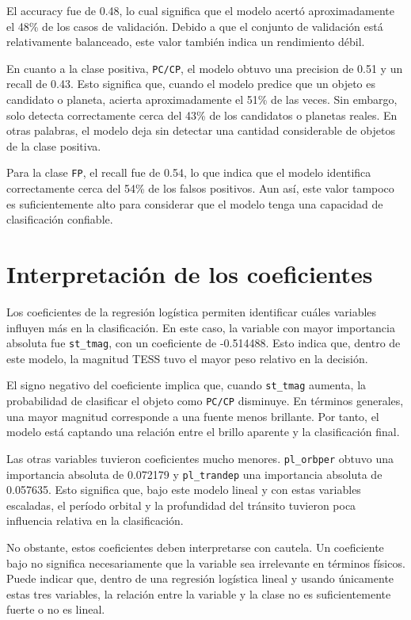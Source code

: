 \documentclass[12pt,letterpaper]{article}
\begin{document}
El accuracy fue de 0.48, lo cual significa que el modelo acertó aproximadamente el 48\% de los casos de validación. Debido a que el conjunto de validación está relativamente balanceado, este valor también indica un rendimiento débil.

En cuanto a la clase positiva, \texttt{PC/CP}, el modelo obtuvo una precision de 0.51 y un recall de 0.43. Esto significa que, cuando el modelo predice que un objeto es candidato o planeta, acierta aproximadamente el 51\% de las veces. Sin embargo, solo detecta correctamente cerca del 43\% de los candidatos o planetas reales. En otras palabras, el modelo deja sin detectar una cantidad considerable de objetos de la clase positiva.

Para la clase \texttt{FP}, el recall fue de 0.54, lo que indica que el modelo identifica correctamente cerca del 54\% de los falsos positivos. Aun así, este valor tampoco es suficientemente alto para considerar que el modelo tenga una capacidad de clasificación confiable.

\section{Interpretación de los coeficientes}

Los coeficientes de la regresión logística permiten identificar cuáles variables influyen más en la clasificación. En este caso, la variable con mayor importancia absoluta fue \texttt{st\_tmag}, con un coeficiente de -0.514488. Esto indica que, dentro de este modelo, la magnitud TESS tuvo el mayor peso relativo en la decisión.

El signo negativo del coeficiente implica que, cuando \texttt{st\_tmag} aumenta, la probabilidad de clasificar el objeto como \texttt{PC/CP} disminuye. En términos generales, una mayor magnitud corresponde a una fuente menos brillante. Por tanto, el modelo está captando una relación entre el brillo aparente y la clasificación final.

Las otras variables tuvieron coeficientes mucho menores. \texttt{pl\_orbper} obtuvo una importancia absoluta de 0.072179 y \texttt{pl\_trandep} una importancia absoluta de 0.057635. Esto significa que, bajo este modelo lineal y con estas variables escaladas, el período orbital y la profundidad del tránsito tuvieron poca influencia relativa en la clasificación.

No obstante, estos coeficientes deben interpretarse con cautela. Un coeficiente bajo no significa necesariamente que la variable sea irrelevante en términos físicos. Puede indicar que, dentro de una regresión logística lineal y usando únicamente estas tres variables, la relación entre la variable y la clase no es suficientemente fuerte o no es lineal.
\end{document}
